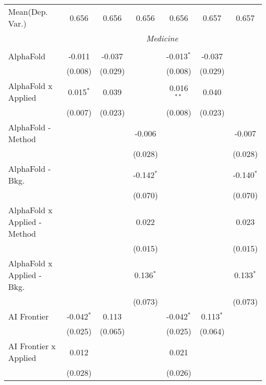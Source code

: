 \begin{tabular}{lcccccc}
Mean(Dep. Var.) & 0.656 & 0.656 & 0.656 & 0.656 & 0.657 & 0.657 \\
 & \multicolumn{6}{c}{\textit{Medicine}} \\ \\
   AlphaFold                    & -0.011       & -0.037  &              & -0.013$^{*}$ & -0.037      &   \\   
                                & (0.008)      & (0.029) &              & (0.008)      & (0.029)     &   \\   
   AlphaFold x Applied          & 0.015$^{*}$  & 0.039   &              & 0.016$^{**}$ & 0.040       &   \\   
                                & (0.007)      & (0.023) &              & (0.008)      & (0.023)     &   \\   
   AlphaFold - Method           &              &         & -0.006       &              &             & -0.007\\   
                                &              &         & (0.028)      &              &             & (0.028)\\   
   AlphaFold - Bkg.             &              &         & -0.142$^{*}$ &              &             & -0.140$^{*}$\\   
                                &              &         & (0.070)      &              &             & (0.070)\\   
   AlphaFold x Applied - Method &              &         & 0.022        &              &             & 0.023\\   
                                &              &         & (0.015)      &              &             & (0.015)\\   
   AlphaFold x Applied - Bkg.   &              &         & 0.136$^{*}$  &              &             & 0.133$^{*}$\\   
                                &              &         & (0.073)      &              &             & (0.073)\\   
   AI Frontier                  & -0.042$^{*}$ & 0.113   &              & -0.042$^{*}$ & 0.113$^{*}$ &   \\   
                                & (0.025)      & (0.065) &              & (0.025)      & (0.064)     &   \\   
   AI Frontier x Applied        & 0.012        &         &              & 0.021        &             &   \\   
                                & (0.028)      &         &              & (0.026)      &             &   \\   

\end{tabular}

